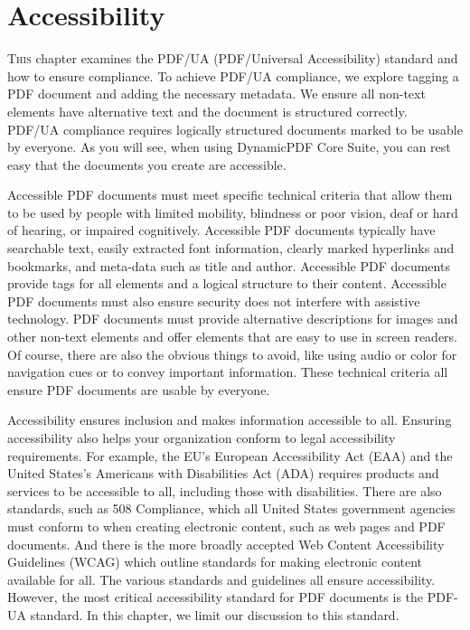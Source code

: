 \documentclass[american,letterpaper]{tufte-book}
\numberwithin{equation}{section}
\numberwithin{figure}{section}
\def\color#1{}%
\begin{document}
{{\chapter{Accessibility}\label{chap:Accessibility}
\color{black}
\BgThispage
\vspace{8.00em}
\lettrine[lines=2,lhang=0.1]{T}{his} chapter examines the PDF/UA (PDF/Universal Accessibility) standard
and how to ensure compliance. To achieve PDF/UA
compliance, we explore tagging a PDF document and adding the necessary
metadata. We ensure all non-text elements have alternative text and
the document is structured correctly. PDF/UA compliance
requires logically structured documents marked to be usable
by everyone. As you will see, when using DynamicPDF Core Suite,
you can rest easy that the documents you create are accessible.

Accessible PDF documents must meet specific technical criteria that
allow them to be used by people with limited
mobility, blindness or poor vision, deaf or hard of hearing, or impaired
cognitively. Accessible PDF documents typically have searchable text,
easily extracted font information, clearly marked hyperlinks and bookmarks,
and meta-data such as title and author. Accessible PDF documents provide
tags for all elements and a logical structure to their content.
Accessible PDF documents must also ensure security does not interfere
with assistive technology. PDF documents must provide alternative
descriptions for images and other non-text elements and offer elements that are easy to use in screen readers. Of course,
there are also the obvious things to avoid, like using audio or color
for navigation cues or to convey important information. These technical
criteria all ensure PDF documents are usable by everyone.

Accessibility ensures inclusion and makes information accessible to
all. Ensuring accessibility also helps your organization conform to
legal accessibility requirements. For example, the EU’s European Accessibility
Act (EAA) and the United States’s Americans with Disabilities Act
(ADA) requires products and services to be accessible to all, including
those with disabilities. There are also standards, such as 508 Compliance,
which all United States government agencies must conform to when creating
electronic content, such as web pages and PDF documents. And there
is the more broadly accepted Web Content Accessibility Guidelines
(WCAG) which outline standards for making electronic content available
for all. The various standards and guidelines all ensure accessibility.
However, the most critical accessibility standard for PDF documents is
the PDF-UA standard. In this chapter, we limit our discussion to this
standard.

}}
\end{document}

